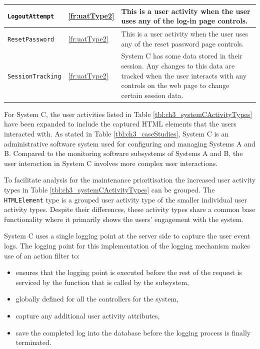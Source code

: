 \begin{table}[!htb]
\begin{tabularx}{\textwidth}{|l|l|X|}
		\hline \texttt{LogoutAttempt} & \ref{fr:uatType2} & \RaggedRight This is a user activity when the user uses any of the log-in page controls. \\
		\hline \texttt{ResetPassword} & \ref{fr:uatType2} & \RaggedRight This is a user activity when the user uses any of the reset password page controls. \\
		\hline \texttt{SessionTracking} & \ref{fr:uatType2} & \RaggedRight System C has some data stored in their session. Any changes to this data are tracked when the user interacts with any controls on the web page to change certain session data. \\
		\hline
	\end{tabularx}
\end{table}

For System C, the user activities listed in Table \ref{tbl:ch3_systemCActivityTypes} have been expanded to include the captured HTML elements that the users interacted with. As stated in Table \ref{tbl:ch3_caseStudies}, System C is an administrative software system used for configuring and managing Systems A and B. Compared to the monitoring software subsystems of Systems A and B, the user interaction in System C involves more complex user interactions.\par To facilitate analysis for the maintenance prioritisation the increased user activity types in Table \ref{tbl:ch3_systemCActivityTypes} can be grouped. The \texttt{HTMLElement} type is a grouped user activity type of the smaller individual user activity types. Despite their differences, these activity types share a common base functionality where it primarily shows the users' engagement with the system.\par System C uses a single logging point at the server side to capture the user event logs. The logging point for this implementation of the logging mechanism makes use of an action filter to:

\begin{itemize}
	\item ensures that the logging point is executed before the rest of the request is serviced by the function that is called by the subsystem,
	\item globally defined for all the controllers for the system,
	\item capture any additional user activity attributes,
	\item save the completed log into the database before the logging process is finally terminated.
\end{itemize}

